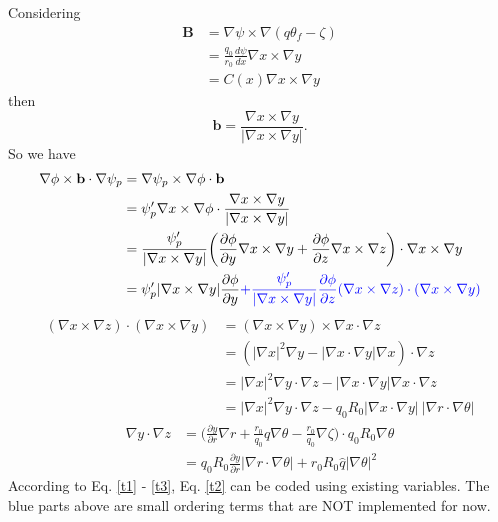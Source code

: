 \documentclass[12pt]{article}
\begin{document}
\begin{CJK*}{UTF8}{gbsn}
Considering
\begin{equation}
\begin{split}
    \mathbf{B}&=\nabla\psi\times\nabla(q\theta_f-\zeta)\\
    &=\frac{q_0}{r_0}\frac{d\psi}{dx}\nabla x\times\nabla y\\
    &=C(x)\nabla x\times\nabla y
\end{split}
\end{equation}
then
\begin{equation}
    \mathbf{b}=\frac{\nabla x\times\nabla y}{|\nabla x\times\nabla y|}.
\end{equation}
So we have
\begin{equation}
    \begin{split}
        \nabla\phi\times\mathbf{b}\cdot\nabla\psi_p &= \nabla\psi_p\times\nabla\phi\cdot\mathbf{b}\\
        &=\psi_p'\nabla x\times\nabla\phi\cdot\frac{\nabla x\times\nabla y}{|\nabla x\times\nabla y|}\\
        &=\frac{\psi_p'}{|\nabla x\times\nabla y|}\bigg(\frac{\partial\phi}{\partial y}\nabla x\times\nabla y
        + \frac{\partial\phi}{\partial z}\nabla x\times\nabla z\bigg)\cdot\nabla x\times\nabla y\\
        &=\psi_p'|\nabla x\times\nabla y|\frac{\partial\phi}{\partial y} {\color{blue}+ \frac{\psi_p'}{|\nabla x\times\nabla y|}
        \frac{\partial\phi}{\partial z}(\nabla x\times\nabla z)\cdot(\nabla x\times\nabla y)}\label{t1}
    \end{split}
\end{equation}
{\color{blue}
\begin{equation}
    \begin{split}
        (\nabla x\times\nabla z)\cdot(\nabla x\times\nabla y)&=(\nabla x\times\nabla y)\times\nabla x\cdot\nabla z\\
        &=(|\nabla x|^2\nabla y - |\nabla x\cdot\nabla y|\nabla x)\cdot\nabla z\\
        &=|\nabla x|^2\nabla y\cdot\nabla z - |\nabla x\cdot\nabla y|\nabla x\cdot\nabla z\\
        &=|\nabla x|^2\nabla y\cdot\nabla z - q_0R_0|\nabla x\cdot\nabla y|\ |\nabla r\cdot\nabla\theta|
    \end{split}
\end{equation}
\begin{equation}
    \begin{split}
        \nabla y\cdot\nabla z &= \bigg(\frac{\partial y}{\partial r}\nabla r + \frac{r_0}{q_0}\hat{q}\nabla\theta 
        - \frac{r_0}{q_0}\nabla\zeta\bigg)\cdot q_0 R_0\nabla\theta\\
        &=q_0R_0\frac{\partial y}{\partial r}|\nabla r\cdot\nabla\theta| + r_0R_0\hat{q}|\nabla\theta|^2\label{t3}
    \end{split}
\end{equation}
}
According to Eq. \ref{t1} - \ref{t3}, Eq. \ref{t2} can be coded using existing variables. The blue parts above are 
small ordering terms that are NOT implemented for now. 


\end{CJK*}
\end{document}
